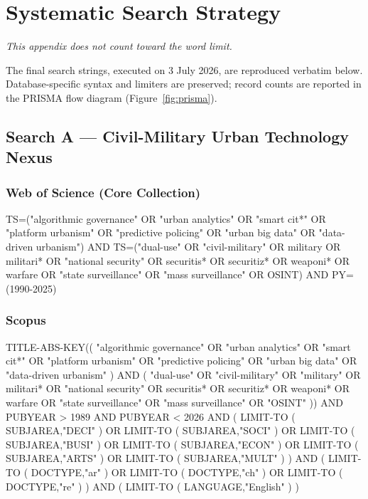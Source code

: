 \chapter{Systematic Search Strategy}
\label{app:search}

\emph{This appendix does not count toward the word limit.}

The final search strings, executed on 3 July 2026, are reproduced verbatim below. Database-specific syntax and limiters are preserved; record counts are reported in the PRISMA flow diagram (Figure~\ref{fig:prisma}).

\section{Search A --- Civil-Military Urban Technology Nexus}

\subsection{Web of Science (Core Collection)}

{\small\ttfamily\raggedright TS=("algorithmic governance" OR "urban analytics" OR "smart cit*" OR "platform urbanism" OR "predictive policing" OR "urban big data" OR "data-driven urbanism") AND TS=("dual-use" OR "civil-military" OR military OR militari* OR "national security" OR securitis* OR securitiz* OR weaponi* OR warfare OR "state surveillance" OR "mass surveillance" OR OSINT) AND PY=(1990-2025)\par}

\subsection{Scopus}

{\small\ttfamily\raggedright TITLE-ABS-KEY(( "algorithmic governance" OR "urban analytics" OR "smart cit*" OR "platform urbanism" OR "predictive policing" OR "urban big data" OR "data-driven urbanism" ) AND ( "dual-use" OR "civil-military" OR "military" OR militari* OR "national security" OR securitis* OR securitiz* OR weaponi* OR warfare OR "state surveillance" OR "mass surveillance" OR "OSINT" )) AND PUBYEAR > 1989 AND PUBYEAR < 2026 AND ( LIMIT-TO ( SUBJAREA,"DECI" ) OR LIMIT-TO ( SUBJAREA,"SOCI" ) OR LIMIT-TO ( SUBJAREA,"BUSI" ) OR LIMIT-TO ( SUBJAREA,"ECON" ) OR LIMIT-TO ( SUBJAREA,"ARTS" ) OR LIMIT-TO ( SUBJAREA,"MULT" ) ) AND ( LIMIT-TO ( DOCTYPE,"ar" ) OR LIMIT-TO ( DOCTYPE,"ch" ) OR LIMIT-TO ( DOCTYPE,"re" ) ) AND ( LIMIT-TO ( LANGUAGE,"English" ) )\par}

